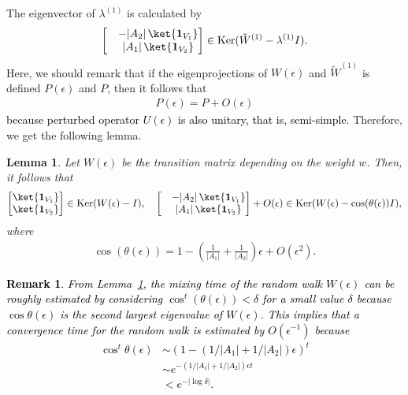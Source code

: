 \documentclass[12pt]{article}
\newtheorem{lemma}{Lemma}
\newtheorem{remark}{Remark}
\numberwithin{lemma}{section}
\numberwithin{proposition}{section}
\numberwithin{remark}{section}
\numberwithin{definition}{section}
\newcommand{\red}{\textcolor{black}}
\begin{document}
The eigenvector of $\lambda^{(1)}$ is calculated by
\begin{align*}
    \begin{bmatrix}
            &-|A_2|\,\ket{\boldsymbol{1}_{V_1}} \\
            &|A_1|\, \ket{\boldsymbol{1}_{V_2}}
        \end{bmatrix}
        \in \mathrm{Ker}(\tilde
        W^{(1)}-\lambda^{(1)} I).
\end{align*}
Here, we should remark that if the eigenprojections of $W(\epsilon)$ and $\tilde{W}^{(1)}$ is defined $P(\epsilon)$ and $P$, then it follows that
\begin{align*}
    P(\epsilon)=P+O(\epsilon)
\end{align*}
\red{because perturbed operator $U(\epsilon)$ is also unitary, that is, semi-simple.}
Therefore, we get the following lemma.
\begin{lemma}
    \label{lem: eigenpair of W}
    Let $W(\epsilon)$ be \red{the} transition matrix depending on the weight $w$. Then, it follows that
    \begin{align*}
        \begin{bmatrix}
            \ket{\boldsymbol{1}_{V_1}} \\
            \ket{\boldsymbol{1}_{V_2}}
        \end{bmatrix}
        \in \mathrm{Ker}(W(\epsilon)-I), 
        \quad
        \begin{bmatrix}
            &-|A_2|\,\ket{\boldsymbol{1}_{V_1}} \\
            &|A_1|\, \ket{\boldsymbol{1}_{V_2}}
        \end{bmatrix}+O(\epsilon)
        \in \mathrm{Ker}(W(\epsilon)-\cos (\theta(\epsilon)) I),
    \end{align*}
    where
    \begin{align*}
        \cos (\theta(\epsilon))=1-\left(\frac{1}{|A_1|}+\frac{1}{|A_2|}\right)\epsilon+O(\epsilon^2).
    \end{align*}
\end{lemma}
\red{
\begin{remark}\label{rem:rwconverge}
From Lemma~\ref{lem: eigenpair of W}, the mixing time of the random walk $W(\epsilon)$ can be roughly estimated by considering $\cos^t(\theta(\epsilon))<\delta$ for a small value $\delta$ because $\cos\theta(\epsilon)$ is the second largest eigenvalue of $W(\epsilon)$. 
This implies that a convergence time for the random walk is estimated by 
$O(\epsilon^{-1})$ because 
\begin{align*} 
\cos^t\theta(\epsilon) &\sim (1-(1/|A_1|+1/|A_2|)\epsilon)^t \\ 
&\sim e^{-(1/|A_1|+1/|A_2|)\epsilon t} \\
& <e^{-|\log \delta|}. 
\end{align*}
\end{remark}
}
\end{document}
